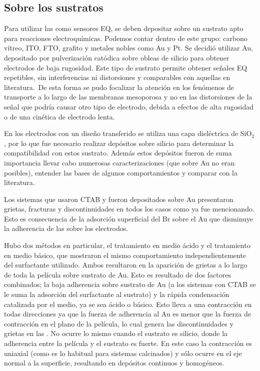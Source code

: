 	\subsection{Sobre los sustratos}

			Para utilizar las \pdm\space como sensores EQ, se deben depositar sobre un sustrato apto para reacciones electroquímicas. Podemos contar dentro de este grupo: carbono vítreo, ITO, FTO, grafito y metales nobles como Au y Pt. Se decidió utilizar Au, depositado por pulverización catódica sobre obleas de silicio para obtener electrodos de baja rugosidad. Este tipo de sustrato permite obtener señales EQ repetibles, sin interferencias ni distorsiones y comparables con aquellas en literatura.\  De esta forma se pudo focalizar la atención en los fenómenos de transporte a lo largo de las membranas mesoporosa y no en las distorsiones de la señal que podría causar otro tipo de electrodo, debida a efectos de alta rugosidad o de una cinética de electrodo lenta.\cite{Wi2000,Bockris1974}
		
		    En los electrodos con un diseño transferido se utiliza una capa dieléctrica de SiO$_2$, por lo que fue necesario realizar depósitos sobre silicio para determinar la compatibilidad con estos sustrato. Además estos depósitos fueron de suma importancia llevar cabo numerosas caracterizaciones (que sobre Au no eran posibles), entender las bases de algunos comportamientos y comparar con la literatura.

			Los sistemas que usaron CTAB y fueron depositados sobre Au presentaron grietas, fracturas y discontinuidades en todos los casos como ya fue mencionando. Esto es consecuencia de la adsorción superficial del Br sobre el Au que disminuye la adherencia de las \pdm\space sobre los electrodos. 

			Hubo dos métodos en particular, el tratamiento en medio ácido y el tratamiento en medio básico, que mostraron el mismo comportamiento independientemente del surfactante utilizado. Ambos resultaron en la aparición de grietas a lo largo de toda la película sobre sustrato de Au. Esto es resultado de dos factores combinados; la baja adherencia sobre sustrato de Au (a los sistemas con CTAB se le suma la adsorción del surfactante al sustrato) y la rápida condensación catalizada por el medio, ya se sea ácido o básico. Esto lleva a una contracción en todas direcciones ya que la fuerza de adherencia al Au es menor que la fuerza de contracción en el plano de la película, lo cual genera las discontinuidades y grietas en las \pdm. No ocurre lo mismo cuando el sustrato es silicio, donde la adherencia entre la película y el sustrato es fuerte. En este caso la contracción es uniaxial (como es lo habitual para sistemas calcinados) y sólo ocurre en el eje normal a la superficie, resultando en depósitos continuos y homogéneos.

